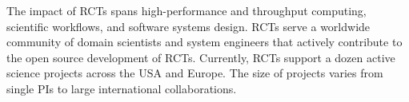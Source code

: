 \documentclass[preprint,12pt, a4paper]{elsarticle}
\begin{document}


The impact of RCTs spans high-performance and throughput computing, scientific
workflows, and software systems design. RCTs serve a worldwide community of
domain scientists and system engineers that actively contribute to the open
source development of RCTs. Currently, RCTs support a dozen active science
projects across the USA and Europe. The size of projects varies from single PIs
to large international collaborations.

\end{document}
